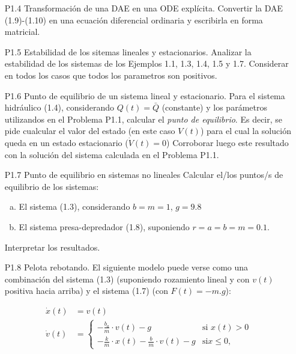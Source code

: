 \documentclass{article}
\begin{document}
\begin{itemize}
\begin{enumerate}[a)]
\end{enumerate}
  \item[P1.4] Transformación de una DAE en una ODE explícita. Convertir la DAE (1.9)-(1.10) en una ecuación diferencial ordinaria y escribirla en forma matricial.

  \item[P1.5] Estabilidad de los sitemas lineales y estacionarios. Analizar la estabilidad de los sistemas de los Ejemplos 1.1, 1.3, 1.4, 1.5 y 1.7. Considerar en todos los casos que todos los parametros son positivos.

  \item[P1.6] Punto de equilibrio de un sistema lineal y estacionario. Para el sistema hidráulico (1.4), considerando $Q(t)=\bar{Q}$ (constante) y los parámetros utilizandos en el Problema P1.1, calcular el \textit{punto de equilibrio}. Es decir, se pide cualcular el valor del estado (en este caso $V(t)$) para el cual la solución queda en un estado estacionario ($\dot{V}(t)=0$)
Corroborar luego este resultado con la solución del sistema calculada en el Problema P1.1.

   \item[P1.7] Punto de equilibrio en sistemas no lineales Calcular el/los puntos/s de equilibrio de los sistemas:
	\begin{enumerate}[a)]
	\item El sistema (1.3), considerando $b=m=1$, $g=9.8$
	\item El sistema presa-depredador (1.8), suponiendo $r=a=b=m=0.1$. 
	\end{enumerate}

Interpretar los resultados.




   \item[P1.8] Pelota rebotando. El siguiente modelo puede verse como una combinación del sistema (1.3) (suponiendo rozamiento lineal y con $v(t)$ positiva hacia arriba) y el sistema (1.7) (con $F(t)=-m.g$):

\begin{align*}
  \dot{x}(t) &= v(t) \\
 \label{P1.8a} \tag{P1.8a}
  \dot{v}(t) &=   \begin{cases}
    -\frac{b_{a}}{m} \cdot v(t) - g & \text{si } x(t) > 0\\
    -\frac{k}{m} \cdot x(t) - \frac{b}{m} \cdot v(t) - g & \text {si} x \leq 0,
  \end{cases}\\
\end{align*}
\end{itemize}
\end{document}
